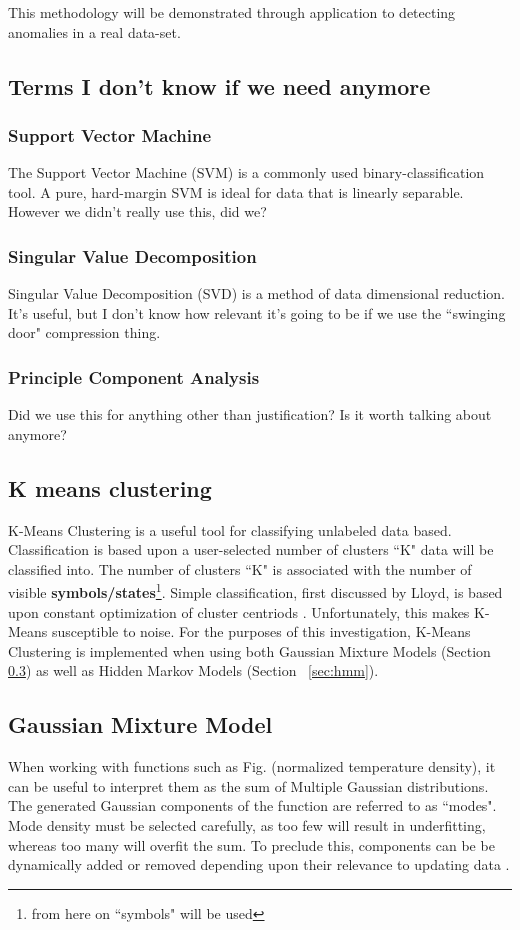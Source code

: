 \documentclass[twocolumn,10pt]{article}
\begin{document}
This methodology will be demonstrated through application to detecting anomalies in a real data-set.

\subsection{Terms I don't know if we need anymore}

\subsubsection{Support Vector Machine}\cite{SVM}
The Support Vector Machine (SVM) is a commonly used binary-classification tool. A pure, hard-margin SVM is ideal for data that is linearly separable. However we didn't really use this, did we?

\subsubsection{Singular Value Decomposition}
Singular Value Decomposition (SVD) is a method of data dimensional reduction. It's useful, but I don't know how relevant it's going to be if we use the ``swinging door" compression thing.

\subsubsection{Principle Component Analysis}
Did we use this for anything other than justification? Is it worth talking about anymore?

\subsection{K means clustering}\label{sec:kmeans}
K-Means Clustering is a useful tool for classifying unlabeled data based. Classification is based upon a user-selected number of clusters ``K" data will be classified into. The number of clusters ``K" is associated with the number of visible \textbf{symbols/states}\footnote{from here on ``symbols" will be used}. Simple classification, first discussed by Lloyd, is based upon constant optimization of cluster centriods \cite{pcm} . Unfortunately, this makes K-Means susceptible to noise. For the purposes of this investigation, K-Means Clustering is implemented when using both Gaussian Mixture Models (Section \ref{sec:gmm}) as well as Hidden Markov Models (Section ~\ref{sec:hmm}).

\subsection{Gaussian Mixture Model}\label{sec:gmm}
When working with functions such as Fig. (normalized temperature density), it can be useful to interpret them as the sum of Multiple Gaussian distributions. The generated Gaussian components of the function are referred to as ``modes". Mode density must be selected carefully, as too few will result in underfitting, whereas too many will overfit the sum. To preclude this, components can be be dynamically added or removed depending upon their relevance to updating data \cite{GMM}.
\end{document}
